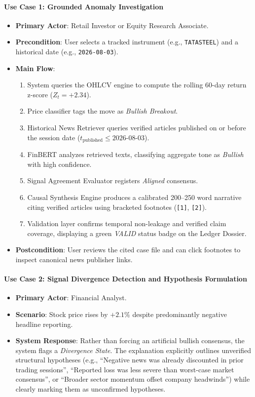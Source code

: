 \documentclass{article}
\begin{document}
	\paragraph{Use Case 1: Grounded Anomaly Investigation}
	\begin{itemize}
		\item \textbf{Primary Actor}: Retail Investor or Equity Research Associate.
		\item \textbf{Precondition}: User selects a tracked instrument (e.g., \texttt{TATASTEEL}) and a historical date (e.g., \texttt{2026-08-03}).
		\item \textbf{Main Flow}:
			\begin{enumerate}
				\item System queries the OHLCV engine to compute the rolling 60-day return z-score ($Z_t = +2.34$).
				\item Price classifier tags the move as \textit{Bullish Breakout}.
				\item Historical News Retriever queries verified articles published on or before the session date ($t_{\text{published}} \le 2026\text{-}08\text{-}03$).
				\item FinBERT analyzes retrieved texts, classifying aggregate tone as \textit{Bullish} with high confidence.
				\item Signal Agreement Evaluator registers \textit{Aligned} consensus.
				\item Causal Synthesis Engine produces a calibrated 200--250 word narrative citing verified articles using bracketed footnotes (\texttt{[1]}, \texttt{[2]}).
				\item Validation layer confirms temporal non-leakage and verified claim coverage, displaying a green \textit{VALID} status badge on the Ledger Dossier.
			\end{enumerate}
		\item \textbf{Postcondition}: User reviews the cited case file and can click footnotes to inspect canonical news publisher links.
	\end{itemize}

	\paragraph{Use Case 2: Signal Divergence Detection and Hypothesis Formulation}
	\begin{itemize}
		\item \textbf{Primary Actor}: Financial Analyst.
		\item \textbf{Scenario}: Stock price rises by $+2.1\%$ despite predominantly negative headline reporting.
		\item \textbf{System Response}: Rather than forcing an artificial bullish consensus, the system flags a \textit{Divergence State}. The explanation explicitly outlines unverified structural hypotheses (e.g., ``Negative news was already discounted in prior trading sessions'', ``Reported loss was less severe than worst-case market consensus'', or ``Broader sector momentum offset company headwinds'') while clearly marking them as unconfirmed hypotheses.
	\end{itemize}
\end{document}
